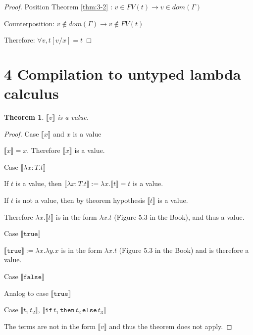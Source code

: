 \documentclass[13pt, a4paper]{article}
\newtheorem{theorem}{Theorem}
\begin{document}
\begin{proof}

Position Theorem \ref{thm:3-2} : $v\in FV(t) \to v \in dom(\Gamma)$

Counterposition: $v \notin dom(\Gamma) \to v\notin FV(t)$

Therefore: $\forall v, t[v/x]=t$

\end{proof}

\section*{4 Compilation to untyped lambda calculus}

\begin{theorem}\label{thm:4-1}
$\llbracket v \rrbracket$ is a value.
\end{theorem}

\begin{proof} Case $\llbracket x \rrbracket$ and $x$ is a value

$\llbracket x \rrbracket = x$. Therefore $\llbracket x \rrbracket$ is a value.

\noindent Case $\llbracket \lambda x:T.t \rrbracket$

If $t$ is a value, then $\llbracket \lambda x:T.t \rrbracket := \lambda x.\llbracket t \rrbracket = t$ is a value.

If $t$ is not a value, then by theorem hypothesis $\llbracket t \rrbracket$ is a value.

Therefore $\lambda x.\llbracket t \rrbracket$ is in the form $\lambda x.t$ (Figure 5.3 in the Book), and thus a value.

\noindent Case $\llbracket \texttt{true} \rrbracket$

$\llbracket \texttt{true} \rrbracket := \lambda x.\lambda y.x$ is in the form $\lambda x.t$ (Figure 5.3 in the Book) and is therefore a value.

\noindent Case $\llbracket \texttt{false} \rrbracket$

Analog to case $\llbracket \texttt{true} \rrbracket$

\noindent Case $\llbracket t_1\,t_2 \rrbracket$, $\llbracket \texttt{if}\,t_1\,\texttt{then}\,t_2\,\texttt{else}\,t_3 \rrbracket$

The terms are not in the form $\llbracket v \rrbracket$ and thus the theorem does not apply.

\end{proof}
\end{document}
